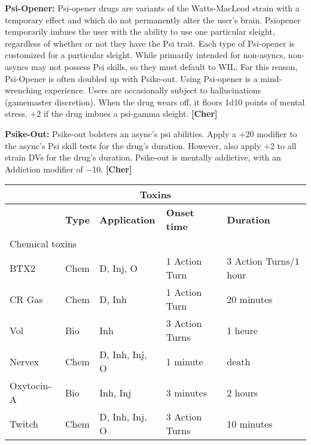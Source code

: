 {{\textbf{Psi-Opener:} Psi-opener drugs are variants of the Watts-MacLeod strain with a temporary effect and which do not permanently alter the user’s brain. Psiopener temporarily imbues the user with the ability to use one particular sleight, regardless of whether or not they have the Psi trait. Each type of Psi-opener is customized for a particular sleight. While primarily intended for non-asyncs, non-asyncs may not possess Psi skills, so they must default to WIL. For this reason, Psi-Opener is often doubled up with Psike-out. Using Psi-opener is a mind-wrenching experience. Users are occasionally subject to hallucinations (gamemaster discretion). When the drug wears off, it floors 1d10 points of mental stress, +2 if the drug imbues a psi-gamma sleight. \textbf{[Cher]} 

\textbf{Psike-Out:} Psike-out bolsters an async’s psi abilities. Apply a +20 modifier to the async’s Psi skill tests for the drug’s duration. However, also apply +2 to all strain DVs for the drug’s duration. Psike-out is mentally addictive, with an Addiction modifier of $-$10. \textbf{[Cher]} 

\begin{table} 

\begin{tabular}{|l|l|l|l|l|} \hline

\multicolumn{5}{|c|}{\textbf{Toxins}} \\ \hline

&\textbf{Type}	&\textbf{Application}	&\textbf{Onset time}	&\textbf{Duration} \\ \hline

\multicolumn{5}{|l|}{Chemical toxins} \\ \hline

BTX2	&Chem	&D, Inj, O	&1 Action Turn	&3 Action Turns/1 hour \\ \hline

CR Gas	&Chem	&D, Inh	&1 Action Turn	&20 minutes \\ \hline

Vol	&Bio	&Inh	&3 Action Turns	&1 heure \\ \hline

Nervex	&Chem	&D, Inh, Inj, O	&1 minute	&death \\ \hline

Oxytocin-A	&Bio	&Inh, Inj	&3 minutes	&2 hours \\ \hline

Twitch	&Chem	&D, Inh, Inj, O	&3 Action Turns	&10 minutes \\ \hline


\end{tabular}
\end{table}}}
